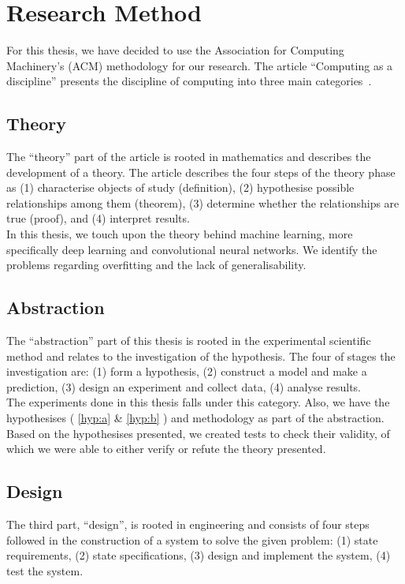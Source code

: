 \section{Research Method}
For this thesis, we have decided to use the Association for Computing Machinery's (ACM) methodology for our research. The article ``Computing as a discipline'' presents the discipline of computing into three main categories~\cite{Denning:1989:CD:63238.63239}. 
\subsection{Theory}
The ``theory'' part of the article is rooted in mathematics and describes the development of a theory. The article describes the four steps of the theory phase as (1) characterise objects of study (definition), (2) hypothesise
possible relationships among them (theorem), (3) determine whether the
relationships are true (proof), and (4) interpret results.\\

In this thesis, we touch upon the theory behind machine learning, more specifically deep learning and convolutional neural networks. We identify the problems regarding overfitting and the lack of generalisability.



\subsection{Abstraction}
The ``abstraction'' part of this thesis is rooted in the experimental scientific method and relates to the investigation of the hypothesis. The four of stages the investigation are: (1) form a hypothesis, (2) construct a model and make a prediction, (3) design an experiment and collect data, (4) analyse results. \\

The experiments done in this thesis falls under this category. Also, we have the hypothesises ( \ref{hyp:a} \& \ref{hyp:b} ) and methodology as part of the abstraction. Based on the hypothesises presented, we created tests to check their validity, of which we were able to either verify or refute the theory presented.



\subsection{Design}
The third part, ``design'', is rooted in engineering
and consists of four steps followed in the construction
of a system to solve the given problem: (1) state requirements, (2) state specifications, (3) design and implement the system, (4) test the system. \\

